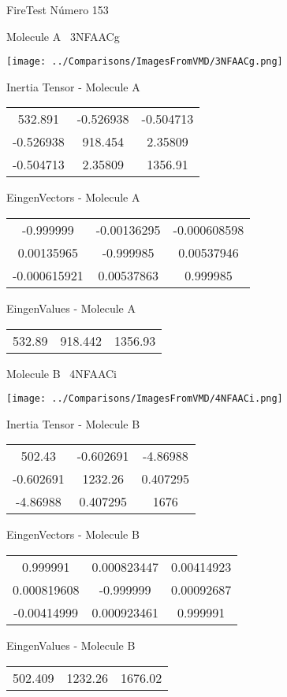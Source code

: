 \vtab[-3cm]
\begin{center}
{\large FireTest \tab Número 153}
\end{center}
\begin{multicols}{2}
\begin{center}

Molecule A \
3NFAACg

\texttt{[image: ../Comparisons/ImagesFromVMD/3NFAACg.png]}

Inertia Tensor - Molecule A \\
\begin{tabular}{|c c c|}
532.891	 & 	-0.526938	 & 	-0.504713	 \\
-0.526938	 & 	918.454	 & 	2.35809	 \\
-0.504713	 & 	2.35809	 & 	1356.91
\end{tabular}

\vtab
 EingenVectors - Molecule A     \\
\begin{tabular}{|c c c|}
-0.999999	 & 	-0.00136295	 & 	-0.000608598	 \\
0.00135965	 & 	-0.999985	 & 	0.00537946	 \\
-0.000615921	 & 	0.00537863	 & 	0.999985
\end{tabular}

\vtab
 EingenValues - Molecule A     \\
\begin{tabular}{|c c c|}
532.89	 & 	918.442	 & 	1356.93	 \\
\end{tabular}
\columnbreak

Molecule B \
4NFAACi

\texttt{[image: ../Comparisons/ImagesFromVMD/4NFAACi.png]}

Inertia Tensor - Molecule B \\
\begin{tabular}{|c c c|}
502.43	 & 	-0.602691	 & 	-4.86988	 \\
-0.602691	 & 	1232.26	 & 	0.407295	 \\
-4.86988	 & 	0.407295	 & 	1676
\end{tabular}

\vtab
 EingenVectors - Molecule B     \\
\begin{tabular}{|c c c|}
0.999991	 & 	0.000823447	 & 	0.00414923	 \\
0.000819608	 & 	-0.999999	 & 	0.00092687	 \\
-0.00414999	 & 	0.000923461	 & 	0.999991
\end{tabular}

\vtab
 EingenValues - Molecule B     \\
\begin{tabular}{|c c c|}
502.409	 & 	1232.26	 & 	1676.02	 \\
\end{tabular}

\end{center}
\end{multicols}

